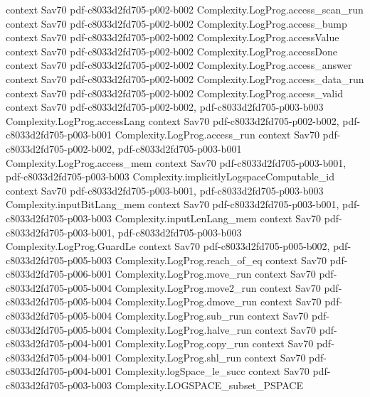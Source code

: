 \begin{theorem}
  {context}
  {Sav70}
  {pdf-c8033d2fd705-p002-b002}
\proofstep
  {Complexity.LogProg.access_scan_run}
  {context}
  {Sav70}
  {pdf-c8033d2fd705-p002-b002}
\proofstep
  {Complexity.LogProg.access_bump}
  {context}
  {Sav70}
  {pdf-c8033d2fd705-p002-b002}
\proofstep
  {Complexity.LogProg.accessValue}
  {context}
  {Sav70}
  {pdf-c8033d2fd705-p002-b002}
\proofstep
  {Complexity.LogProg.accessDone}
  {context}
  {Sav70}
  {pdf-c8033d2fd705-p002-b002}
\proofstep
  {Complexity.LogProg.access_answer}
  {context}
  {Sav70}
  {pdf-c8033d2fd705-p002-b002}
\proofstep
  {Complexity.LogProg.access_data_run}
  {context}
  {Sav70}
  {pdf-c8033d2fd705-p002-b002}
\proofstep
  {Complexity.LogProg.access_valid}
  {context}
  {Sav70}
  {pdf-c8033d2fd705-p002-b002,
    pdf-c8033d2fd705-p003-b003}
\proofstep
  {Complexity.LogProg.accessLang}
  {context}
  {Sav70}
  {pdf-c8033d2fd705-p002-b002,
    pdf-c8033d2fd705-p003-b001}
\proofstep
  {Complexity.LogProg.access_run}
  {context}
  {Sav70}
  {pdf-c8033d2fd705-p002-b002,
    pdf-c8033d2fd705-p003-b001}
\proofstep
  {Complexity.LogProg.access_mem}
  {context}
  {Sav70}
  {pdf-c8033d2fd705-p003-b001,
    pdf-c8033d2fd705-p003-b003}
\proofstep
  {Complexity.implicitlyLogspaceComputable_id}
  {context}
  {Sav70}
  {pdf-c8033d2fd705-p003-b001,
    pdf-c8033d2fd705-p003-b003}
\proofstep
  {Complexity.inputBitLang_mem}
  {context}
  {Sav70}
  {pdf-c8033d2fd705-p003-b001,
    pdf-c8033d2fd705-p003-b003}
\proofstep
  {Complexity.inputLenLang_mem}
  {context}
  {Sav70}
  {pdf-c8033d2fd705-p003-b001,
    pdf-c8033d2fd705-p003-b003}
\proofstep
  {Complexity.LogProg.GuardLe}
  {context}
  {Sav70}
  {pdf-c8033d2fd705-p005-b002,
    pdf-c8033d2fd705-p005-b003}
\proofstep
  {Complexity.LogProg.reach_of_eq}
  {context}
  {Sav70}
  {pdf-c8033d2fd705-p006-b001}
\proofstep
  {Complexity.LogProg.move_run}
  {context}
  {Sav70}
  {pdf-c8033d2fd705-p005-b004}
\proofstep
  {Complexity.LogProg.move2_run}
  {context}
  {Sav70}
  {pdf-c8033d2fd705-p005-b004}
\proofstep
  {Complexity.LogProg.dmove_run}
  {context}
  {Sav70}
  {pdf-c8033d2fd705-p005-b004}
\proofstep
  {Complexity.LogProg.sub_run}
  {context}
  {Sav70}
  {pdf-c8033d2fd705-p005-b004}
\proofstep
  {Complexity.LogProg.halve_run}
  {context}
  {Sav70}
  {pdf-c8033d2fd705-p004-b001}
\proofstep
  {Complexity.LogProg.copy_run}
  {context}
  {Sav70}
  {pdf-c8033d2fd705-p004-b001}
\proofstep
  {Complexity.LogProg.shl_run}
  {context}
  {Sav70}
  {pdf-c8033d2fd705-p004-b001}
\proofstep
  {Complexity.logSpace_le_succ}
  {context}
  {Sav70}
  {pdf-c8033d2fd705-p003-b003}
\proofstep
  {Complexity.LOGSPACE_subset_PSPACE}

\end{theorem}
